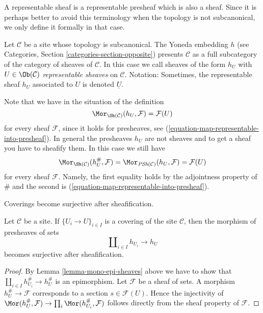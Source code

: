 \noindent
A representable sheaf is a representable presheaf which is also a
sheaf. Since it is perhaps better to avoid this terminology when the
topology is not subcanonical, we only define it formally in that case.

\begin{definition}
\label{definition-representable-sheaf}
Let $\mathcal{C}$ be a site whose topology is subcanonical.
The Yoneda embedding $h$ (see
Categories, Section \ref{categories-section-opposite})
presents $\mathcal{C}$ as a full subcategory of the
category of sheaves of $\mathcal{C}$. In this case
we call sheaves of the form $h_U$ with $U \in \Ob(\mathcal{C})$
{\it representable sheaves} on $\mathcal{C}$.
Notation: Sometimes, the representable sheaf $h_U$ associated to $U$ is
denoted {\it $\underline{U}$}.
\end{definition}

\noindent
Note that we have in the situation of the definition
$$
\Mor_{\Sh(\mathcal{C})}(h_U, \mathcal{F}) = \mathcal{F}(U)
$$
for every sheaf $\mathcal{F}$, since it holds for presheaves, see
(\ref{equation-map-representable-into-presheaf}). In general the
presheaves $h_U$ are not sheaves and to get a sheaf you have to
sheafify them. In this case we still have
\begin{equation}
\label{equation-map-representable-into-sheaf}
\Mor_{\Sh(\mathcal{C})}(h_U^\#, \mathcal{F}) =
\Mor_{\textit{PSh}(\mathcal{C})}(h_U, \mathcal{F}) =
\mathcal{F}(U)
\end{equation}
for every sheaf $\mathcal{F}$. Namely, the first equality holds
by the adjointness property of $\#$ and the second is
(\ref{equation-map-representable-into-presheaf}).

\begin{lemma}
\label{lemma-covering-surjective-after-sheafification}
\begin{slogan}
Coverings become surjective after sheafification.
\end{slogan}
Let $\mathcal{C}$ be a site. If
$\{U_i \to U\}_{i \in I}$ is a covering of the site
$\mathcal{C}$, then the morphism of presheaves of sets
$$
\coprod\nolimits_{i \in I} h_{U_i} \to h_U
$$
becomes surjective after sheafification.
\end{lemma}

\begin{proof}
By Lemma \ref{lemma-mono-epi-sheaves} above we have to show that
$\coprod\nolimits_{i \in I} h_{U_i}^\# \to h_U^\#$
is an epimorphism. Let $\mathcal{F}$ be a sheaf of sets.
A morphism $h_U^\# \to \mathcal{F}$
corresponds to a section $s \in \mathcal{F}(U)$.
Hence the injectivity of $\Mor(h_U^\#, \mathcal{F})
\to \prod_i \Mor(h_{U_i}^\#, \mathcal{F})$ follows
directly from the sheaf property of $\mathcal{F}$.
\end{proof}

